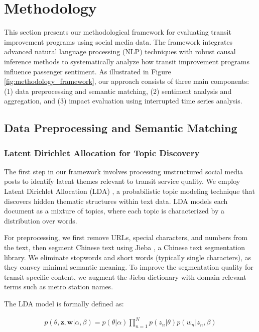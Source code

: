 \documentclass[a4paper,fleqn,12pt]{cas-sc}
\begin{document}
\section{Methodology}\label{sec:Methodology}

This section presents our methodological framework for evaluating transit improvement programs using social media data. The framework integrates advanced natural language processing (NLP) techniques with robust causal inference methods to systematically analyze how transit improvement programs influence passenger sentiment. As illustrated in Figure \ref{fig:methodology_framework}, our approach consists of three main components: (1) data preprocessing and semantic matching, (2) sentiment analysis and aggregation, and (3) impact evaluation using interrupted time series analysis.

\subsection{Data Preprocessing and Semantic Matching}

\subsubsection{Latent Dirichlet Allocation for Topic Discovery}

The first step in our framework involves processing unstructured social media posts to identify latent themes relevant to transit service quality. We employ Latent Dirichlet Allocation (LDA) \citep{blei2003latent}, a probabilistic topic modeling technique that discovers hidden thematic structures within text data. LDA models each document as a mixture of topics, where each topic is characterized by a distribution over words.

For preprocessing, we first remove URLs, special characters, and numbers from the text, then segment Chinese text using Jieba \citep{sun2012jieba}, a Chinese text segmentation library. We eliminate stopwords and short words (typically single characters), as they convey minimal semantic meaning. To improve the segmentation quality for transit-specific content, we augment the Jieba dictionary with domain-relevant terms such as metro station names.

The LDA model is formally defined as:

\begin{align}
p(\theta, \mathbf{z}, \mathbf{w} | \alpha, \beta) = p(\theta | \alpha) \prod_{n=1}^{N} p(z_n | \theta) p(w_n | z_n, \beta)
\end{align}
\end{document}
